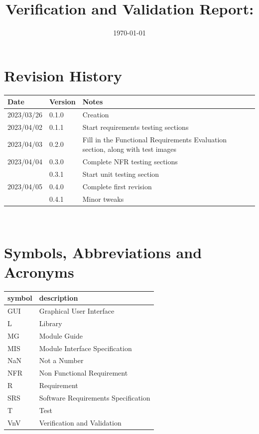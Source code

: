 \documentclass[12pt, titlepage]{article}
\begin{document}
\title{Verification and Validation Report: \progname} 
\author{\authname}
\date{\today}
	
\maketitle


\section{Revision History}

\begin{tabularx}{\textwidth}{p{3cm}p{2cm}X}
\toprule {\bf Date} & {\bf Version} & {\bf Notes}\\
\midrule
2023/03/26 & 0.1.0 & Creation\\
2023/04/02 & 0.1.1 & Start requirements testing sections\\
2023/04/03 & 0.2.0 & Fill in the Functional Requirements Evaluation
  section, along with test images\\
2023/04/04 & 0.3.0 & Complete NFR testing sections\\
           & 0.3.1 & Start unit testing section\\
2023/04/05 & 0.4.0 & Complete first revision\\
           & 0.4.1 & Minor tweaks\\
\bottomrule
\end{tabularx}

~\newpage

\section{Symbols, Abbreviations and Acronyms}

\renewcommand{\arraystretch}{1.2}
\begin{tabular}{l l} 
  \toprule		
  \textbf{symbol} & \textbf{description}\\
  \midrule 
  GUI & Graphical User Interface\\
  L & Library\\
  MG & Module Guide\\
  MIS & Module Interface Specification\\
  NaN & Not a Number\\
  NFR & Non Functional Requirement\\
  R & Requirement\\
  SRS & Software Requirements Specification\\
  T & Test\\
  VnV & Verification and Validation\\
  \bottomrule
\end{tabular}\\
\end{document}
